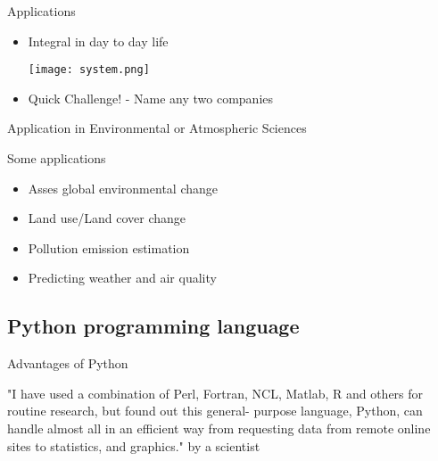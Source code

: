 


\begin{frame}{Applications}
	\begin{beamerboxesrounded}{}
		\begin{itemize}
			\item Integral in day to day life
			
			{\centering
			\texttt{[image: system.png]} }
			
			\item Quick Challenge! - Name any two companies 
		\end{itemize}
	\end{beamerboxesrounded}
\end{frame}


\begin{frame}{Application in Environmental or Atmospheric Sciences}
	\begin{beamerboxesrounded}{Some applications}
		\begin{itemize}
			\item Asses global environmental change
			\item Land use/Land cover change  
			\item Pollution emission estimation
			\item Predicting weather and air quality
		\end{itemize}
	\end{beamerboxesrounded}
\end{frame}

\subsection[Python programming language]{Python programming language}

\begin{frame}{Advantages of Python}
	\begin{beamerboxesrounded}{}
		"I have used a combination of Perl, Fortran, NCL, Matlab, R and others for routine research, but found out this general- purpose language, Python, can handle almost all in an efficient way from requesting data from remote online sites to statistics, and graphics."
		by a scientist
	\end{beamerboxesrounded}
\end{frame}

